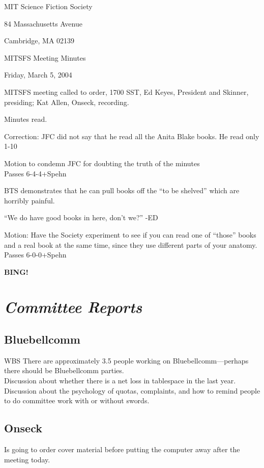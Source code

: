\documentclass[10pt]{article}
\newcommand{\bing}{{\bf BING!} }
\newcommand{\goto}[1]{\bing \vskip 12pt \section*{{\em{#1}}}}
\begin{document}
\begin{center}

MIT Science Fiction Society 

84 Massachusetts Avenue

Cambridge, MA 02139

\vspace{12pt}

MITSFS Meeting Minutes 

Friday, March 5, 2004

\end{center}
 
\vspace{18pt}

\setlength{\parskip}{6pt}

\noindent
MITSFS meeting called to order, 1700 SST, Ed Keyes, President and
Skinner, presiding; Kat Allen,  Onseck, recording.

Minutes read.

Correction: JFC did not say that he read all the Anita Blake books.  He
read only 1-10

Motion to condemn JFC for doubting the truth of the minutes \\
Passes 6-4-4+Spehn

BTS demonstrates that he can pull books off the ``to be shelved''
which are horribly painful.

``We do have good books in here, don't we?'' -ED

Motion: Have the Society experiment to see if you can read one of
``those'' books and a real book at the same time, since they use
different parts of your anatomy.\\
Passes 6-0-0+Spehn


\goto{Committee Reports}
\subsection*{Bluebellcomm}
WBS 
There are approximately 3.5 people working on Bluebellcomm---perhaps
there should be Bluebellcomm parties.\\
Discussion about whether there is a net loss in tablespace in the last
year.\\
Discussion about the psychology of quotas, complaints, and how to
remind people to do committee work with or without swords.

\subsection*{Onseck}
Is going to order cover material before putting the computer away
after the meeting today.
\end{document}
